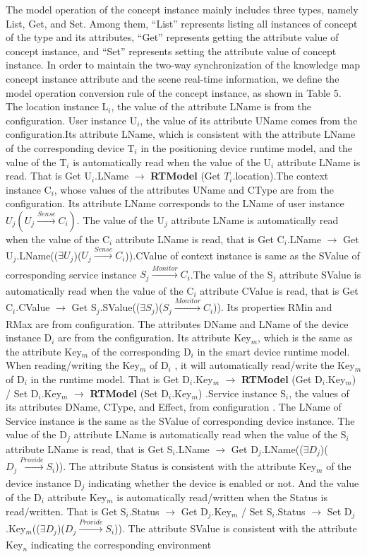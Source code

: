 The model operation of the concept instance mainly includes three types, namely List, Get, and Set. Among them, “List” represents listing all instances of concept of the type and its attributes, “Get” represents getting the attribute value of concept instance, and “Set” represents setting the attribute value of concept instance. In order to maintain the two-way synchronization of the knowledge map concept instance attribute and the scene real-time information, we define the model operation conversion rule of the concept instance, as shown in Table 5. The location instance L$_{i}$, the value of the attribute LName is from the configuration. User instance U$_{i}$, the value of its attribute UName comes from the configuration.Its attribute LName, which is consistent with the attribute LName of the corresponding device T$_{i}$ in the positioning device runtime model, and the value of the T$_{i}$ is automatically read when the value of the U$_{i}$ attribute LName is read. That is Get U$_{i}$.LName $\to$ \textbf{RTModel} (Get $T_{i}$.location).The context instance C$_{i}$, whose values of the attributes UName and CType are from the configuration. Its attribute LName corresponds to the LName of user instance $U_{j} (U_{j}\xrightarrow[]{Sense} C_{i})$. The value of the U$_{j}$ attribute LName is automatically read when the value of the C$_{i}$ attribute LName is read, that is Get C$_{i}$.LName $\to$ Get U$_{j}$.LName(($\exists U_{j}$)($U_{j}\xrightarrow[]{Sense} C_{i}$)).CValue of context instance is same as the SValue of corresponding service instance $S_{j}\xrightarrow[]{Monitor}C_{i}$.The value of the S$_{j}$ attribute SValue is automatically read when the value of the C$_{i}$ attribute CValue is read, that is Get C$_{i}$.CValue $\to$ Get S$_{j}$.SValue(($\exists S_{j}$)($S_{j}\xrightarrow[]{Monitor}C_{i}$)). Its properties RMin and RMax are from configuration. The attributes DName and LName of the device instance D$_{i}$ are from the configuration. Its attribute Key$_{m}$, which is the same as the attribute Key$_{m}$ of the corresponding D$_{i}$ in the smart device runtime model. When reading/writing the Key$_{m}$ of D$_{i}$ , it will automatically read/write the Key$_{m}$ of D$_{i}$ in the runtime model. That is Get D$_{i}$.Key$_{m}$ $\to$ \textbf{RTModel} (Get D$_{i}$.Key$_{m}$) / Set D$_{i}$.Key$_{m}$ $\to$ \textbf{RTModel} (Set D$_{i}$.Key$_{m}$) .Service instance S$_{i}$, the values of its attributes DName, CType, and Effect, from configuration . The LName of Service instance is the same as the SValue of corresponding device instance. The value of the D$_{j}$ attribute LName is automatically read when the value of the S$_{i}$ attribute LName is read, that is Get S$_{i}$.LName $\to$ Get D$_{j}$.LName(($\exists D_{j}$)($D_{j}\xrightarrow[]{Provide} S_{i}$)). The attribute Status is consistent with the attribute Key$_{m}$ of the device instance D$_{j}$ indicating whether the device is enabled or not. And the value of the D$_{i}$ attribute Key$_{m}$ is automatically read/written when the Status is read/written. That is Get S$_{i}$.Status $\to$ Get D$_{j}$.Key$_{m}$ / Set S$_{i}$.Status $\to$ Set D$_{j}$.Key$_{m}$(($\exists D_{j}$)($D_{j}\xrightarrow[]{Provide} S_{i}$)). The attribute SValue is consistent with the attribute Key$_{n}$ indicating the corresponding environment 